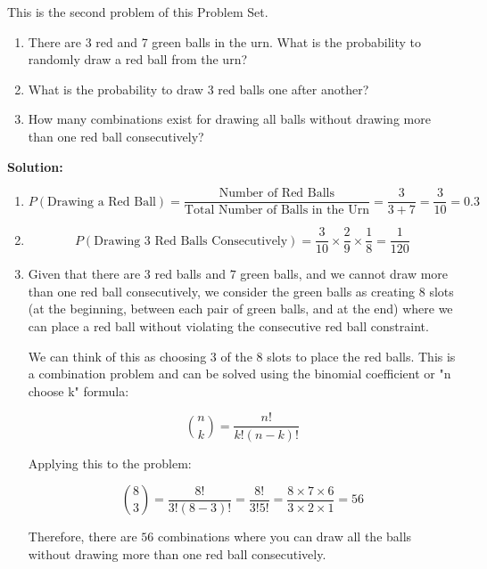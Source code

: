 \documentclass[11pt]{article}
\def\purple{\color{Rhodamine}}
\def\white{\color{White}}
\def\orange{\color{Dandelion}}
\def\sol{\purple \textbf{Solution:}\hskip 8pt \white}
\begin{document}
This is the second problem of this Problem Set.

\begin{enumerate}[label=\orange (\alph*)]
\item There are 3 red and 7 green balls in the urn. What is the probability to randomly draw a red ball from the urn?

\item What is the probability to draw 3 red balls one after another?

\item How many combinations exist for drawing all balls without drawing more than one red ball consecutively?

\end{enumerate}

\sol

\begin{enumerate}[label=\orange (\alph*)]
\item

\[
P(\text{Drawing a Red Ball}) = \frac{\text{Number of Red Balls}}{\text{Total Number of Balls in the Urn}} = \frac{3}{3 + 7} = \frac{3}{10} = 0.3
\]

\item

\[
P(\text{Drawing 3 Red Balls Consecutively}) = \frac{3}{10} \times \frac{2}{9} \times \frac{1}{8} = \frac{1}{120}
\]


\item

Given that there are $3$ red balls and $7$ green balls, and we cannot draw more than one red ball consecutively, we consider the green balls as creating $8$ slots (at the beginning, between each pair of green balls, and at the end) where we can place a red ball without violating the consecutive red ball constraint.

We can think of this as choosing $3$ of the $8$ slots to place the red balls. This is a combination problem and can be solved using the binomial coefficient or "n choose k" formula:

\[
{n \choose k} = \frac{n!}{k!(n - k)!}
\]

Applying this to the problem:

\[
{8 \choose 3} = \frac{8!}{3!(8 - 3)!} = \frac{8!}{3!5!} = \frac{8 \times 7 \times 6}{3 \times 2 \times 1} = 56
\]

Therefore, there are $56$ combinations where you can draw all the balls without drawing more than one red ball consecutively.

\end{enumerate}
\end{document}
